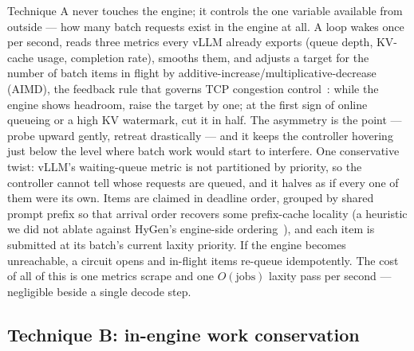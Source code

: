 \documentclass[11pt]{article}
\begin{document}
Technique A never touches the engine; it controls the one variable available from
outside --- how many batch requests exist in the engine at all. A loop wakes once per
second, reads three metrics every vLLM already exports (queue depth, KV-cache usage,
completion rate), smooths them, and adjusts a target for the number of batch items in
flight by additive-increase/multiplicative-decrease (AIMD), the feedback rule that
governs TCP congestion control~\citep{aimd}: while the engine shows headroom, raise the
target by one; at the first sign of online queueing or a high KV watermark, cut it in
half. The asymmetry is the point --- probe upward gently, retreat drastically --- and
it keeps the controller hovering just below the level where batch work would start to
interfere. One conservative twist: vLLM's waiting-queue metric is not partitioned by
priority, so the controller cannot tell whose requests are queued, and it halves as if
every one of them were its own. Items are claimed in deadline order, grouped by shared
prompt prefix so that arrival order recovers some prefix-cache locality (a heuristic we
did not ablate against HyGen's engine-side ordering~\citep{hygen}), and each item is
submitted at its batch's current laxity priority. If the engine becomes unreachable, a
circuit opens and in-flight items re-queue idempotently. The cost of all of this is one
metrics scrape and one $O(\text{jobs})$ laxity pass per second --- negligible beside a
single decode step.

\subsection{Technique B: in-engine work conservation}
\label{sec:tech-b}
\end{document}
